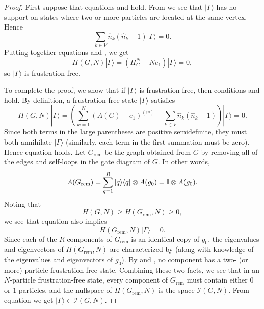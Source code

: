 \documentclass[../thesis-main/thesis-main]{subfiles}
\begin{document}
\begin{proof}
First suppose that equations  and  hold. From  we see that $|\Gamma\rangle$ has no support on states where two or more particles are located at the same vertex. Hence 
\begin{equation}
\sum_{k\in V}\hat{n}_{k}\left(\hat{n}_{k}-1\right)|\Gamma\rangle=0.\label{eq:ff_condition3}
\end{equation}
Putting together equations  and , we get 
\[
H(G,N)|\Gamma\rangle=\left(H_{G}^{N}-Ne_{1}\right)|\Gamma\rangle=0,
\]
so $|\Gamma\rangle$ is frustration free.

To complete the proof, we show that if $|\Gamma\rangle$ is frustration free, then conditions  and  hold. By definition, a frustration-free state $|\Gamma\rangle$ satisfies 
\begin{equation}
H(G,N)|\Gamma\rangle=\left(\sum_{w=1}^{N}\left(A(G)-e_{1}\right)^{(w)}+\sum_{k\in V}\hat{n}_{k}\left(\hat{n}_{k}-1\right)\right)|\Gamma\rangle=0.\label{eq:defn_frustr}
\end{equation}
Since both terms in the large parentheses are positive semidefinite, they must both annihilate $|\Gamma\rangle$ (similarly, each term in the first summation must be zero). Hence equation  holds. Let $G_{\mathrm{rem}}$ be the graph obtained from $G$ by removing all of the edges and self-loops in the gate diagram of $G$. In other words,
\[
A(G_{\mathrm{rem}})=\sum_{q=1}^{R}|q\rangle\langle q|\otimes A(g_{0})=\mathbb{I}\otimes A(g_{0}).
\]
Noting that 
\[
H(G,N)\geq H(G_{\mathrm{rem}},N)\geq0,
\]
we see that equation  also implies 
\begin{equation}
H(G_{\mathrm{rem}},N)|\Gamma\rangle=0.\label{eq:Grem_gamma}
\end{equation}
Since each of the $R$ components of $G_{\mathrm{rem}}$ is an identical copy of $g_{0}$, the eigenvalues and eigenvectors of $H(G_{\mathrm{rem}},N)$ are characterized by  (along with knowledge of the eigenvalues and eigenvectors of $g_{0}$). By  and , no component has a two- (or more) particle frustration-free state. Combining these two facts, we see that in an $N$-particle frustration-free state, every component of $G_{\mathrm{rem}}$ must contain either $0$ or $1$ particles, and the nullspace of $H(G_{\mathrm{rem}},N)$ is the space $\mathcal{I}(G,N).$ From equation  we get $|\Gamma\rangle\in\mathcal{I}(G,N)$.
\end{proof}
\end{document}
